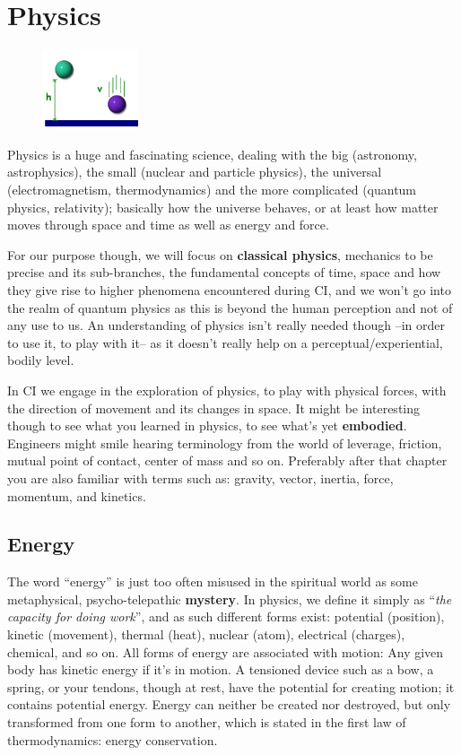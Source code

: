 \chapter{Physics}\label{ch:physics}

\begin{figure}
    \centering
    \includegraphics[width=0.25\textwidth]{images/physics}
\end{figure}

Physics is a huge and fascinating science, dealing with the big (astronomy, astrophysics), the small (nuclear and particle physics), the universal (electromagnetism, thermodynamics) and the more complicated (quantum physics, relativity); basically how the universe behaves, or at least how matter moves through space and time as well as energy and force.

For our purpose though, we will focus on \textbf{classical physics}, mechanics to be precise and its sub-branches, the fundamental concepts of time, space and how they give rise to higher phenomena encountered during CI, and we won't go into the realm of quantum physics as this is beyond the human perception and not of any use to us.
An understanding of physics isn't really needed though --in order to use it, to play with it-- as it doesn't really help on a perceptual/experiential, bodily level.

In CI we engage in the exploration of physics, to play with physical forces, with the direction of movement and its changes in space.
It might be interesting though to see what you learned in physics, to see what's yet \textbf{embodied}.
Engineers might smile hearing terminology from the world of leverage, friction, mutual point of contact, center of mass and so on.
Preferably after that chapter you are also familiar with terms such as: gravity, vector, inertia, force, momentum, and kinetics.

\section{Energy}\label{sec:energy}

The word ``energy'' is just too often misused in the spiritual world as some metaphysical, psycho-telepathic \textbf{mystery}.
In physics, we define it simply as ``\textit{the capacity for doing work}'', and as such different forms exist: potential (position), kinetic (movement), thermal (heat), nuclear (atom), electrical (charges), chemical, and so on.
All forms of energy are associated with motion: Any given body has kinetic energy if it's in motion.
A tensioned device such as a bow, a spring, or your tendons, though at rest, have the potential for creating motion; it contains potential energy.
Energy can neither be created nor destroyed, but only transformed from one form to another, which is stated in the first law of thermodynamics: energy conservation.

